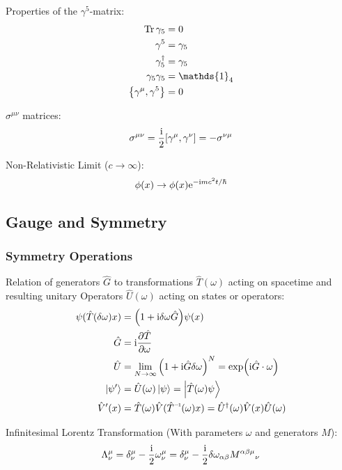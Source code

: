 			\noindent
			Properties of the $\gamma^5$-matrix:
			\begin{align}
				\tr \gamma_5 &= 0 \\
				\gamma^5 &= \gamma_5 \\
				\gamma_5^\dagger &= \gamma_5 \\
				\gamma_5 \gamma_5 &= \mathds{1}_4 \\
				\acomm{\gamma^\mu}{\gamma^5} &= 0
			\end{align}

			\noindent
			$\sigma^{\mu\nu}$ matrices:
			\begin{equation}
				\sigma^{\mu\nu} = \frac{\i}{2}\comm{\gamma^\mu}{\gamma^\nu} = -\sigma^{\nu\mu}
			\end{equation}

			\noindent
			Non-Relativistic Limit ($c \to\infty$):
			\begin{equation}
				\phi(x) \to \phi(x) \mathrm{e}^{-\mathrm{i} m c^2 t/\hbar}
			\end{equation}

	\subsection{Gauge and Symmetry}
		\subsubsection{Symmetry Operations}
			Relation of generators $\hat{G}$ to transformations $\hat{T}(\omega)$ acting on spacetime and resulting unitary Operators $\hat{U}(\omega)$ acting on states or operators:
			\begin{equation}
				\begin{aligned}
					\psi(\hat{T}(\delta \omega)x) &= \qty(1+ \i \delta\omega \hat{G}) \psi(x)\\
					\hat{G} &= \i \pdv{\hat{T}}{\omega} \\
					\hat{U} &= \lim_{N \to \infty} \qty(1+\i\hat{G}\delta\omega)^N = \exp(\i \hat{G} \cdot \omega) \\
					\Ket{\psi'} &= \hat{U}(\omega)\Ket{\psi} = \Ket{\hat{T}(\omega)\psi} \\
					\hat{V}'(x) &= \hat{T}(\omega) \hat{V}(\inv{\hat{T}}(\omega)x) = \hat{U}^\dagger(\omega) \hat{V}(x) \hat{U}(\omega) \\
				\end{aligned}
			\end{equation}

			\noindent
			Infinitesimal Lorentz Transformation (With parameters $\omega$ and generators $M$):
			\begin{equation}
				\begin{aligned}
					\Lambda^\mu_\nu &= \delta^\mu_\nu - \frac{\mathrm{i}}{2}\omega^\mu_\nu = \delta^\mu_\nu - \frac{\mathrm{i}}{2}\delta\omega_{\alpha\beta}M^{\alpha\beta\mu}{}_\nu \\
				\end{aligned}
			\end{equation}


